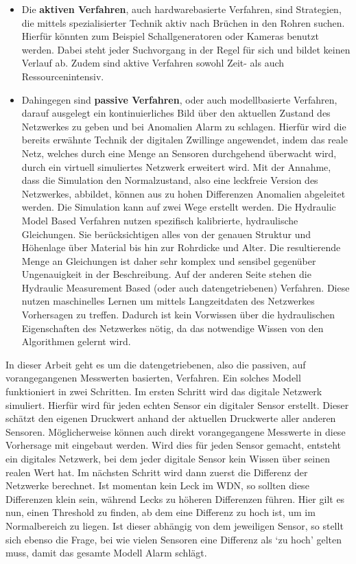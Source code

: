 \begin{itemize}
    
    \item Die \textbf{aktiven Verfahren}, auch hardwarebasierte Verfahren, sind Strategien, die mittels
     spezialisierter Technik aktiv nach Brüchen in den Rohren suchen. Hierfür könnten zum Beispiel
     Schallgeneratoren oder Kameras benutzt werden. Dabei steht jeder Suchvorgang in der Regel für sich
     und bildet keinen Verlauf ab. Zudem sind aktive Verfahren sowohl Zeit- als auch Ressourcenintensiv.

    \item Dahingegen sind \textbf{passive Verfahren}, oder auch modellbasierte Verfahren, darauf ausgelegt
     ein kontinuierliches Bild über den aktuellen Zustand des Netzwerkes zu geben und bei Anomalien Alarm zu
     schlagen. Hierfür wird die bereits erwähnte Technik der digitalen Zwillinge angewendet, indem das reale
     Netz, welches durch eine Menge an Sensoren durchgehend überwacht wird, durch ein virtuell simuliertes
     Netzwerk erweitert wird. Mit der Annahme, dass die Simulation den Normalzustand, also eine leckfreie
     Version des Netzwerkes, abbildet, können aus zu hohen Differenzen Anomalien abgeleitet werden. Die
     Simulation kann auf zwei Wege erstellt werden. Die Hydraulic Model Based Verfahren nutzen spezifisch
     kalibrierte, hydraulische Gleichungen. Sie berücksichtigen alles von der genauen Struktur und Höhenlage
     über Material bis hin zur Rohrdicke und Alter. Die resultierende Menge an Gleichungen ist daher sehr
     komplex und sensibel gegenüber Ungenauigkeit in der Beschreibung. Auf der anderen Seite stehen die
     Hydraulic Measurement Based (oder auch datengetriebenen) Verfahren. Diese nutzen maschinelles Lernen um
     mittels Langzeitdaten des Netzwerkes Vorhersagen zu treffen. Dadurch ist kein Vorwissen über die
     hydraulischen Eigenschaften des Netzwerkes nötig, da das notwendige Wissen von den Algorithmen gelernt wird.
    
\end{itemize}

In dieser Arbeit geht es um die datengetriebenen, also die passiven, auf vorangegangenen Messwerten
 basierten, Verfahren. Ein solches Modell funktioniert in zwei Schritten. Im ersten Schritt wird das
 digitale Netzwerk simuliert. Hierfür wird für jeden echten Sensor ein digitaler Sensor erstellt. Dieser
 schätzt den eigenen Druckwert anhand der aktuellen Druckwerte aller anderen Sensoren. Möglicherweise können
 auch direkt vorangegangene Messwerte in diese Vorhersage mit eingebaut werden. Wird dies für jeden Sensor
 gemacht, entsteht ein digitales Netzwerk, bei dem jeder digitale Sensor kein Wissen über seinen realen Wert
 hat. Im nächsten Schritt wird dann zuerst die Differenz der Netzwerke berechnet. Ist momentan kein Leck im
 WDN, so sollten diese Differenzen klein sein, während Lecks zu höheren Differenzen führen. Hier gilt es nun,
 einen Threshold zu finden, ab dem eine Differenz zu hoch ist, um im Normalbereich zu liegen. Ist dieser
 abhängig von dem jeweiligen Sensor, so stellt sich ebenso die Frage, bei wie vielen Sensoren eine Differenz
 als ‘zu hoch’ gelten muss, damit das gesamte Modell Alarm schlägt.

